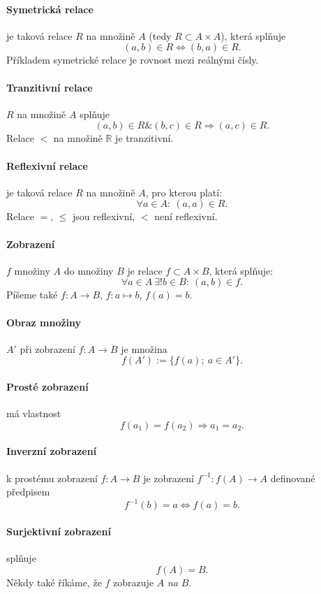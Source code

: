 \documentclass{article}
\newcommand{\0}{\vec{0}}
\newcommand{\R}{\mathbb R}
\begin{document}
\paragraph{Symetrická relace} je taková relace $R$ na množině $A$ (tedy $R\subset A\times A$), která splňuje
$$ (a,b)\in R\Leftrightarrow(b,a)\in R. $$
Příkladem symetrické relace je rovnost mezi reálnými čísly.

\paragraph{Tranzitivní relace} $R$ na množině $A$ splňuje
$$ (a,b)\in R \& (b,c)\in R\Rightarrow (a,c)\in R. $$
Relace $<$ na množině $\R$ je tranzitivní.

\paragraph{Reflexivní relace} je taková relace $R$ na množině $A$, pro kterou platí:
$$ \forall a\in A:~(a,a)\in R. $$
Relace $=$, $\le$ jsou reflexivní, $<$ není reflexivní.


\paragraph{Zobrazení} $f$ množiny $A$ do množiny $B$ je relace $f\subset A\times B$, která splňuje:
$$ \forall a\in A~\exists!b\in B:~(a,b)\in f. $$
Píšeme také $f:A\to B$, $f:a\mapsto b$, $f(a)=b$.

\paragraph{Obraz množiny} $A'$ při zobrazení $f:A\to B$ je množina
$$ f(A'):=\{f(a);~a\in A'\}. $$

\paragraph{Prosté zobrazení} má vlastnost
$$ f(a_1)=f(a_2) \Rightarrow a_1=a_2. $$

\paragraph{Inverzní zobrazení} k prostému zobrazení $f:A\to B$ je zobrazení $f^{-1}:f(A)\to A$ definované předpisem
$$ f^{-1}(b)=a \Leftrightarrow f(a)=b. $$

\paragraph{Surjektivní zobrazení} splňuje
$$ f(A)=B. $$
Někdy také říkáme, že $f$ zobrazuje $A$ \emph{na} $B$.
\end{document}
